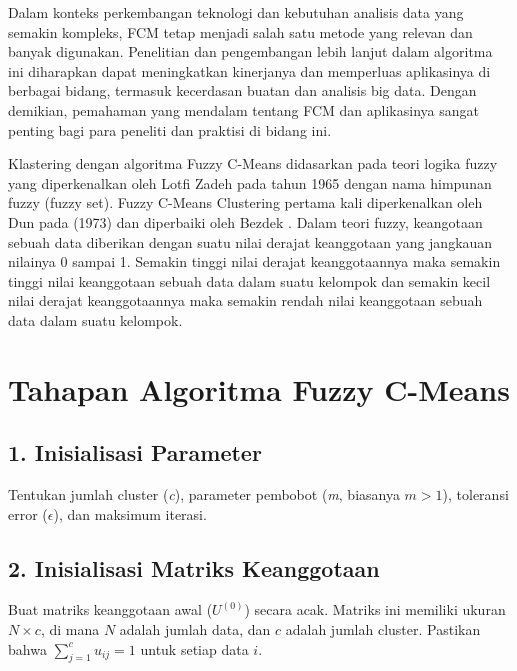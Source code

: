 \documentclass[
  oneside]{book}
\begin{document}
Dalam konteks perkembangan teknologi dan kebutuhan analisis data yang semakin kompleks, FCM tetap menjadi salah satu metode yang relevan dan banyak digunakan. Penelitian dan pengembangan lebih lanjut dalam algoritma ini diharapkan dapat meningkatkan kinerjanya dan memperluas aplikasinya di berbagai bidang, termasuk kecerdasan buatan dan analisis big data. Dengan demikian, pemahaman yang mendalam tentang FCM dan aplikasinya sangat penting bagi para peneliti dan praktisi di bidang ini.

Klastering dengan algoritma Fuzzy C-Means didasarkan pada teori logika fuzzy yang diperkenalkan oleh Lotfi Zadeh pada tahun 1965 dengan nama himpunan fuzzy (fuzzy set). Fuzzy C-Means Clustering pertama kali diperkenalkan oleh Dun pada (1973) dan diperbaiki oleh Bezdek \citep{bezdek1981pattern} . Dalam teori fuzzy, keangotaan sebuah data diberikan dengan suatu nilai derajat keanggotaan yang jangkauan nilainya 0 sampai 1. Semakin tinggi nilai derajat keanggotaannya maka semakin tinggi nilai keanggotaan sebuah data dalam suatu kelompok dan semakin kecil nilai derajat keanggotaannya maka semakin rendah nilai keanggotaan sebuah data dalam suatu kelompok.

\section{Tahapan Algoritma Fuzzy C-Means}\label{tahapan-algoritma-fuzzy-c-means}

\subsection*{1. Inisialisasi Parameter}\label{inisialisasi-parameter}

Tentukan jumlah cluster (\emph{c}), parameter pembobot (\emph{m}, biasanya \(m > 1\)), toleransi error (\(\epsilon\)), dan maksimum iterasi.

\subsection*{2. Inisialisasi Matriks Keanggotaan}\label{inisialisasi-matriks-keanggotaan}

Buat matriks keanggotaan awal (\(U^{(0)}\)) secara acak. Matriks ini memiliki ukuran \(N \times c\), di mana \(N\) adalah jumlah data, dan \(c\) adalah jumlah cluster. Pastikan bahwa \(\sum_{j=1}^c u_{ij} = 1\) untuk setiap data \(i\).
\end{document}
